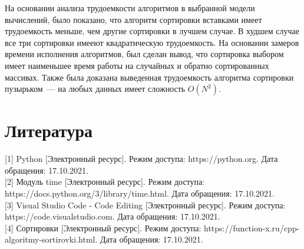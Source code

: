 \documentclass[12pt, a4paper]{report}
\begin{document}
На основании анализа трудоемкости алгоритмов в выбранной модели вычислений, было показано, что алгоритм сортировки вставками имеет трудоемкость меньше, чем другие сортировки в лучшем случае. В худшем случае все три сортировки имееют квадратическую трудоемкость. На основании замеров времени исполнения алгоритмов, был сделан вывод, что сортировка выбором имеет наименьшее время работы на случайных и обратно сортированных массивах. Также была доказана выведенная трудоемкость алгоритма сортировки пузырьком~--- на любых данных имеет сложность $O(N^2)$.

\chapter*{Литература}

[1] Python [Электронный ресурс]. Режим доступа: https://python.org. Дата обращения: 17.10.2021.\\

[2] Модуль time [Электронный ресурс]. Режим доступа: \newline https://docs.python.org/3/library/time.html. Дата обращения: 17.10.2021.\\

[3] Visual Studio Code - Code Editing [Электронный ресурс]. Режим доступа: \newline https://code.visualstudio.com. Дата обращения: 17.10.2021.\\

[4] Сортировки [Электронный ресурс]. Режим доступа: \newline https://function-x.ru/cpp-algoritmy-sortirovki.html. Дата обращения: 17.10.2021.
\end{document}
